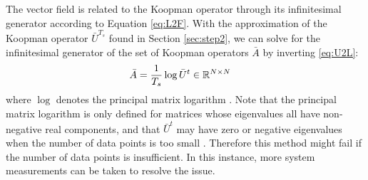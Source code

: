 The vector field is related to the Koopman operator through its infinitesimal generator according to Equation \eqref{eq:L2F}.
With the approximation of the Koopman operator $\bar{U}^{T_s}$ found in Section \ref{sec:step2}, we can solve for the infinitesimal generator of the set of Koopman operators $\bar{A}$ by inverting \eqref{eq:U2L}:
\begin{align}
    \bar{A} &= \frac{1}{T_s} \log{ \bar{U}^t } \in \mathbb{R}^{N \times N}
\end{align}
where $\log$ denotes the principal matrix logarithm \cite[Chapter 11]{higham2008functions}.
Note that the principal matrix logarithm is only defined for matrices whose eigenvalues all have non-negative real components, and that $\bar{U}^t$ may have zero or negative eigenvalues when the number of data points is too small \cite{mauroy2016linear}.
Therefore this method might fail if the number of data points is insufficient.
In this instance, more system measurements can be taken to resolve the issue.

